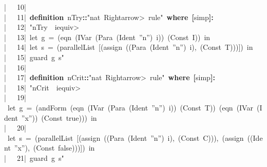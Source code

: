 \documentclass{article}
\newcommand{\syntaxKEYWORDA}[1]{\textcolor[rgb]{0.0,0.4,0.6}{\textbf{#1}}}
\newcommand{\syntaxKEYWORDB}[1]{\textcolor[rgb]{0.0,0.6,0.4}{\textbf{#1}}}
\newcommand{\syntaxLITERALA}[1]{\textcolor[rgb]{1.0,0.0,0.8}{#1}}
\newcommand{\syntaxOPERATOR}[1]{\textcolor[rgb]{0.0,0.0,0.0}{\textbf{#1}}}
\newcommand{\syntaxKEYWORDA}[1]{\textcolor[rgb]{0.0,0.4,0.6}{\textbf{#1}}}
\newcommand{\syntaxKEYWORDB}[1]{\textcolor[rgb]{0.0,0.6,0.4}{\textbf{#1}}}
\newcommand{\syntaxLITERALA}[1]{\textcolor[rgb]{1.0,0.0,0.8}{#1}}
\newcommand{\syntaxOPERATOR}[1]{\textcolor[rgb]{0.0,0.0,0.0}{\textbf{#1}}}
\newcommand{\syntaxKEYWORDA}[1]{\textcolor[rgb]{0.0,0.4,0.6}{\textbf{#1}}}
\newcommand{\syntaxKEYWORDB}[1]{\textcolor[rgb]{0.0,0.6,0.4}{\textbf{#1}}}
\newcommand{\syntaxLITERALA}[1]{\textcolor[rgb]{1.0,0.0,0.8}{#1}}
\newcommand{\syntaxOPERATOR}[1]{\textcolor[rgb]{0.0,0.0,0.0}{\textbf{#1}}}
\newcommand{\syntaxKEYWORDA}[1]{\textcolor[rgb]{0.0,0.4,0.6}{#1}}
\newcommand{\syntaxKEYWORDB}[1]{\textcolor[rgb]{0.0,0.6,0.4}{#1}}
\newcommand{\syntaxLITERALA}[1]{\textcolor[rgb]{1.0,0.0,0.8}{\textbf{#1}}}
\newcommand{\syntaxOPERATOR}[1]{\textcolor[rgb]{0.0,0.0,0.0}{#1}}
\newcommand{\syntaxKEYWORDA}[1]{\textcolor[rgb]{0.0,0.4,0.6}{#1}}
\newcommand{\syntaxKEYWORDB}[1]{\textcolor[rgb]{0.0,0.6,0.4}{#1}}
\newcommand{\syntaxLITERALA}[1]{\textcolor[rgb]{1.0,0.0,0.8}{#1}}
\newcommand{\syntaxOPERATOR}[1]{\textcolor[rgb]{0.0,0.0,0.0}{#1}}
\newcommand{\syntaxKEYWORDA}[1]{\textcolor[rgb]{0.0,0.4,0.6}{\textbf{#1}}}
\newcommand{\syntaxKEYWORDB}[1]{\textcolor[rgb]{0.0,0.6,0.4}{\textbf{#1}}}
\newcommand{\syntaxLITERALA}[1]{\textcolor[rgb]{1.0,0.0,0.8}{#1}}
\newcommand{\syntaxOPERATOR}[1]{\textcolor[rgb]{0.0,0.0,0.0}{\textbf{#1}}}
\newcommand{\gutter}[1]{\textcolor[rgb]{0,0,0}{{|}#1}}
\newcommand{\gutterH}[1]{\textcolor[rgb]{1,0,0}{{|}#1}}
\begin{document}
\gutterH{\ \ \ 10{|}\ }\hspace*{\fill}\\
\gutter{\ \ \ 11{|}\ }\syntaxKEYWORDA{definition}{\ }n\usebox{\underscorebox}Try\syntaxOPERATOR{::}\syntaxLITERALA{"nat{\ }\<Rightarrow>{\ }rule"}{\ }\syntaxKEYWORDB{where}{\ }\syntaxOPERATOR{{[}}simp\syntaxOPERATOR{{]}}\syntaxOPERATOR{:}\hspace*{\fill}\\
\gutter{\ \ \ 12{|}\ }\syntaxLITERALA{"n\usebox{\underscorebox}Try{\ }{\ }i\<equiv>}\hspace*{\fill}\\
\gutter{\ \ \ 13{|}\ }\syntaxLITERALA{let{\ }g{\ }={\ }(eqn{\ }(IVar{\ }(Para{\ }(Ident{\ }''n''){\ }i)){\ }(Const{\ }I)){\ }in}\hspace*{\fill}\\
\gutter{\ \ \ 14{|}\ }\syntaxLITERALA{let{\ }s{\ }={\ }(parallelList{\ }{[}(assign{\ }((Para{\ }(Ident{\ }''n''){\ }i),{\ }(Const{\ }T))){]}){\ }in}\hspace*{\fill}\\
\gutterH{\ \ \ 15{|}\ }\syntaxLITERALA{guard{\ }g{\ }s"}\hspace*{\fill}\\
\gutter{\ \ \ 16{|}\ }\hspace*{\fill}\\
\gutter{\ \ \ 17{|}\ }\syntaxKEYWORDA{definition}{\ }n\usebox{\underscorebox}Crit\syntaxOPERATOR{::}\syntaxLITERALA{"nat{\ }\<Rightarrow>{\ }rule"}{\ }\syntaxKEYWORDB{where}{\ }\syntaxOPERATOR{{[}}simp\syntaxOPERATOR{{]}}\syntaxOPERATOR{:}\hspace*{\fill}\\
\gutter{\ \ \ 18{|}\ }\syntaxLITERALA{"n\usebox{\underscorebox}Crit{\ }{\ }i\<equiv>}\hspace*{\fill}\\
\gutter{\ \ \ 19{|}\ }\syntaxLITERALA{let{\ }g{\ }={\ }(andForm{\ }(eqn{\ }(IVar{\ }(Para{\ }(Ident{\ }''n''){\ }i)){\ }(Const{\ }T)){\ }(eqn{\ }(IVar{\ }(Ident{\ }''x'')){\ }(Const{\ }true))){\ }in}\hspace*{\fill}\\
\gutterH{\ \ \ 20{|}\ }\syntaxLITERALA{let{\ }s{\ }={\ }(parallelList{\ }{[}(assign{\ }((Para{\ }(Ident{\ }''n''){\ }i),{\ }(Const{\ }C))),{\ }(assign{\ }((Ident{\ }''x''),{\ }(Const{\ }false))){]}){\ }in}\hspace*{\fill}\\
\gutter{\ \ \ 21{|}\ }\syntaxLITERALA{guard{\ }g{\ }s"}\hspace*{\fill}\\
\end{document}
